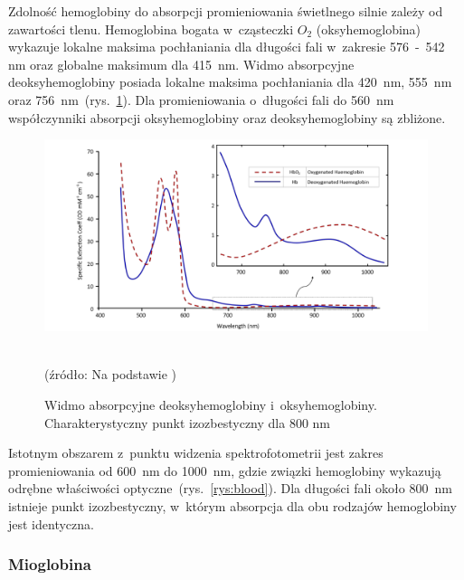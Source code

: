 Zdolność hemoglobiny do absorpcji promieniowania świetlnego silnie zależy od zawartości tlenu. Hemoglobina bogata w~cząsteczki $O_{2}$ (oksyhemoglobina) 
wykazuje lokalne maksima pochłaniania dla długości fali w~zakresie 576~-~542 nm oraz globalne maksimum dla 415~nm. Widmo absorpcyjne deoksyhemoglobiny 
posiada lokalne maksima pochłaniania dla 420~nm, 555~nm oraz 756~nm~(rys.~\ref{rys:hb}). Dla promieniowania o~długości fali do 560~nm współczynniki absorpcji 
oksyhemoglobiny oraz deoksyhemoglobiny są zbliżone.  
\begin{figure}[!ht]
\centerline{\includegraphics[scale = 0.54]{graphic/hb.png}}
	\caption{Widmo absorpcyjne deoksyhemoglobiny i~oksyhemoglobiny. Charakterystyczny punkt izozbestyczny dla 800 nm}
	\label{rys:hb}
	~\\
	(źródło: Na podstawie \cite{Haggblad:2008})
\end{figure}

\noindent Istotnym obszarem z~punktu widzenia spektrofotometrii jest zakres promieniowania od 600~nm do 1000~nm, gdzie związki hemoglobiny wykazują odrębne właściwości 
optyczne~(rys.~\ref{rys:blood}). Dla długości fali około 800~nm istnieje punkt izozbestyczny, w~którym absorpcja dla obu rodzajów hemoglobiny jest identyczna.
\subsubsection{Mioglobina}
\label{subsubsec:hemoglobina}

